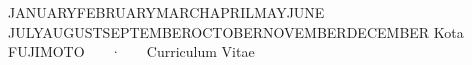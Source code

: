 \documentclass[11pt, letterpaper, draft]{academic-cv}
\newcommand{\cvbuildmonthyear}{%
  \ifcase\month\or
  JANUARY\or FEBRUARY\or MARCH\or APRIL\or MAY\or JUNE\or
  JULY\or AUGUST\or SEPTEMBER\or OCTOBER\or NOVEMBER\or DECEMBER\fi
  \space\number\year
}
\begin{document}
\makecvheader

\makecvfooter
  {\cvbuildmonthyear}
  {Kota FUJIMOTO ~~~·~~~ Curriculum Vitae}
  {\thepage}







% 
% 
%



\end{document}
